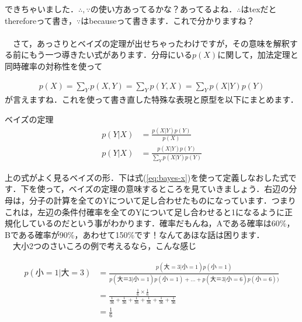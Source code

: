 \documentclass[11pt,a4paper,uplatex]{ujreport} 	%
\begin{document}
できちゃいました．$\therefore, \because$の使い方あってるかな？あってるよね．$\therefore$はtexだとthereforeって書き，$\because$はbecauseって書きます．これで分かりますね？\\
\\
　さて，あっさりとベイズの定理が出せちゃったわけですが，その意味を解釈する前にもう一つ導きたい式があります．分母にいる$p(X)$に関して，加法定理と同時確率の対称性を使って

\begin{align}
\label{eq:bayes-x}
p(X) = \sum_Y p(X,Y) = \sum_Y p(Y,X) = \sum_Y p(X|Y)p(Y)
\end{align}
が言えますね．これを使って書き直した特殊な表現と原型を以下にまとめます．

\begin{screen}
ベイズの定理
\begin{align}
p(Y|X) &= \frac{p(X|Y)p(Y)}{p(X)}\\
p(Y|X) &= \frac{p(X|Y)p(Y)}{\sum_Y p(X|Y)p(Y)}
\end{align}
\end{screen}

上の式がよく見るベイズの形．下は式(\ref{eq:bayes-x})を使って定義しなおした式です．下を使って，ベイズの定理の意味するところを見ていきましょう．右辺の分母は，分子の計算を全てのYについて足し合わせたものになっています．つまりこれは，左辺の条件付確率を全てのYについて足し合わせると1になるように正規化しているのだという事がわかります．確率だもんね，Aである確率は60\%，Bである確率が90\%，あわせて150\%です！なんてあほな話は困ります．\\
　大小2つのさいころの例で考えるなら，こんな感じ


\begin{align}
p(小=1|大=3) &= \frac{p(大=3|小=1)p(小=1)}{p(大＝3|小=1)p(小=1) + ... + p(大＝3|小=6)p(小=6))}\\
&= \frac{\frac{1}{6} \times \frac{1}{6}}{\frac{1}{36} + \frac{1}{36} + \frac{1}{36} + \frac{1}{36} + \frac{1}{36}+ \frac{1}{36}}\\
&= \frac{1}{6}
\end{align}
\end{document}
